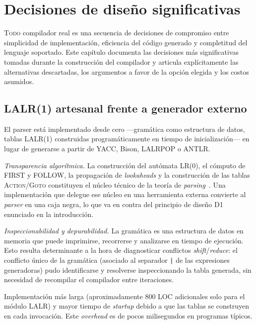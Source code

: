 \documentclass[11pt,a4paper,oneside,openany]{report}
\newcommand{\code}[1]{\texttt{#1}}
\begin{document}
\chapter{Decisiones de diseño significativas}
\label{cap:dec}

\lettrine[lines=2,findent=2pt,nindent=0pt]{T}{odo} compilador real es una secuencia
de decisiones de compromiso entre simplicidad de implementación, eficiencia del
código generado y completitud del lenguaje soportado. Este capítulo documenta
las decisiones más significativas tomadas durante la construcción del compilador
y articula explícitamente las alternativas descartadas, los argumentos a favor de
la opción elegida y los costos asumidos.

\section{LALR(1) artesanal frente a generador externo}

El parser está implementado desde cero ---gramática como estructura de datos,
tablas LALR(1) construidas programáticamente en tiempo de inicialización--- en
lugar de generarse a partir de YACC, Bison, LALRPOP o ANTLR.

\begin{description}[style=nextline]
  \item[Argumento principal]
    \textit{Transparencia algorítmica.} La construcción del autómata LR(0), el
    cómputo de FIRST y FOLLOW, la propagación de \textit{lookaheads} y la
    construcción de las tablas \textsc{Action}/\textsc{Goto} constituyen el núcleo
    técnico de la teoría de \textit{parsing}~\cite{aho2006,deremer1969}. Una
    implementación que delegue ese núcleo en una herramienta externa convierte
    al \textit{parser} en una caja negra, lo que va en contra del principio de
    diseño D1 enunciado en la introducción.
  \item[Argumento secundario]
    \textit{Inspeccionabilidad y depurabilidad.} La gramática es una estructura
    de datos en memoria que puede imprimirse, recorrerse y analizarse en
    tiempo de ejecución. Esto resulta determinante a la hora de diagnosticar
    conflictos \textit{shift}/\textit{reduce}: el conflicto único de la
    gramática (asociado al separador \code{|} de las expresiones generadoras)
    pudo identificarse y resolverse inspeccionando la tabla generada, sin
    necesidad de recompilar el compilador entre iteraciones.
  \item[Coste]
    Implementación más larga (aproximadamente 800 LOC adicionales solo para el
    módulo LALR) y mayor tiempo de \textit{startup} debido a que las tablas se
    construyen en cada invocación. Este \textit{overhead} es de pocos
    milisegundos en programas típicos.
\end{description}
\end{document}
